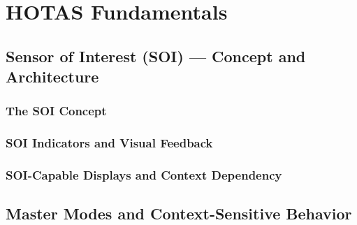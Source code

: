 \documentclass[11pt, a4paper, twoside]{report}
\begin{document}
\chapter{HOTAS Fundamentals}
\label{chap:C2}

\section{Sensor of Interest (SOI) — Concept and Architecture}
\label{sec:C2-S1}

\subsection{The SOI Concept}
\label{sec:C2-S1-S1}

\subsection{SOI Indicators and Visual Feedback}
\label{sec:C2-S1-S2}

\subsection{SOI-Capable Displays and Context Dependency}
\label{sec:C2-S1-S3}

\section{Master Modes and Context-Sensitive Behavior}
\label{sec:C2-S2}
\end{document}
